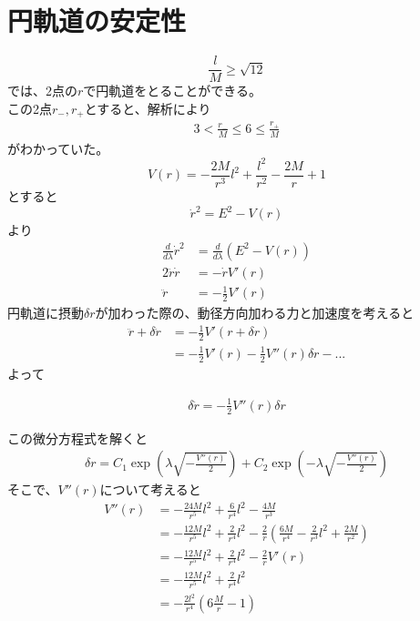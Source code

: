 \documentclass[dvipdfmx]{report} %
\begin{document}
\section{
	円軌道の安定性
}
\[
\frac{l}{M} \geq \sqrt{12}
\]
では、2点の$r$で円軌道をとることができる。\\
この2点$r_{-}, r_{+}$とすると、解析により
\begin{equation}
\begin{split}
3 < \frac{r_{-}}{M} \leq 6 \leq \frac{r_{+}}{M}
\end{split}
\end{equation}
がわかっていた。\\
\[
V(r) = - \frac{2M}{r^3} l^2 + \frac{l^2}{r^2} - \frac{2M}{r} + 1
\]
とすると
\[
\dot{r}^2 = E^2 - V(r)
\]
より
\begin{equation*}
\begin{split}
	\frac{d}{d \lambda} \dot{r}^2 &= \frac{d}{d\lambda} \left( E^2 - V(r) \right)\\
	2 \ddot{r} \dot{r} &= - \dot{r} V'(r)\\
	\ddot{r} &= - \frac{1}{2}V'(r)
\end{split}
\end{equation*}
円軌道に摂動$\delta r$が加わった際の、動径方向加わる力と加速度を考えると
\begin{equation*}
\begin{split}
	\ddot{r} + \delta \ddot{r} &= - \frac{1}{2} V'(r + \delta r)\\
	&= - \frac{1}{2} V'(r) - \frac{1}{2} V''(r)\delta r - ...
\end{split}
\end{equation*}
よって
\begin{tcolorbox}[title=摂動における微分方程式]
\begin{equation}
\begin{split}
	\delta \ddot{r} = - \frac{1}{2} V''(r)\delta r
\end{split}
\end{equation}
\end{tcolorbox}\noindent
この微分方程式を解くと
\begin{equation}
\begin{split}
	\delta r = C_1 \exp \left( \lambda \sqrt{-\frac{V''(r)}{2}} \right) + C_2 \exp \left( - \lambda \sqrt{-\frac{V''(r)}{2}} \right)
\end{split}
\end{equation}
そこで、$V''(r)$について考えると
\begin{equation}
\begin{split}
	V''(r) &= -\frac{24M}{r^5}l^2 + \frac{6}{r^4}l^2 - \frac{4M}{r^3}\\
	&= - \frac{12M}{r^5}l^2 + \frac{2}{r^4}l^2 -\frac{2}{r} \left( \frac{6M}{r^4} - \frac{2}{r^3}l^2 + \frac{2M}{r^2} \right)\\
	&= - \frac{12M}{r^5}l^2 + \frac{2}{r^4}l^2 -\frac{2}{r} V'(r)\\
	&= - \frac{12M}{r^5}l^2 + \frac{2}{r^4}l^2\\
	&= - \frac{2l^2}{r^4} \left( 6 \frac{M}{r} - 1 \right)\\
\end{split}
\end{equation}
\end{document}
